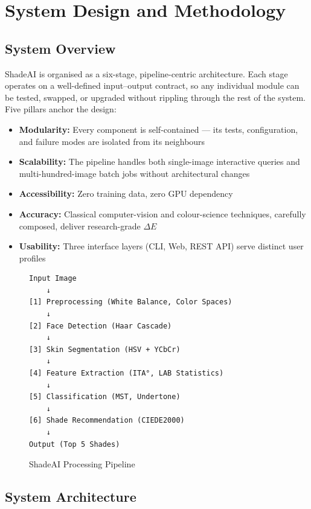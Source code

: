 \chapter{System Design and Methodology}

\section{System Overview}

ShadeAI is organised as a six-stage, pipeline-centric architecture. Each stage operates on a well-defined input–output contract, so any individual module can be tested, swapped, or upgraded without rippling through the rest of the system. Five pillars anchor the design:

\begin{itemize}
    \item \textbf{Modularity:} Every component is self-contained — its tests, configuration, and failure modes are isolated from its neighbours
    \item \textbf{Scalability:} The pipeline handles both single-image interactive queries and multi-hundred-image batch jobs without architectural changes
    \item \textbf{Accessibility:} Zero training data, zero GPU dependency
    \item \textbf{Accuracy:} Classical computer-vision and colour-science techniques, carefully composed, deliver research-grade $\Delta E$
    \item \textbf{Usability:} Three interface layers (CLI, Web, REST API) serve distinct user profiles
\end{itemize}

\begin{figure}[h]
\centering
\begin{verbatim}
Input Image
    ↓
[1] Preprocessing (White Balance, Color Spaces)
    ↓
[2] Face Detection (Haar Cascade)
    ↓
[3] Skin Segmentation (HSV + YCbCr)
    ↓
[4] Feature Extraction (ITA°, LAB Statistics)
    ↓
[5] Classification (MST, Undertone)
    ↓
[6] Shade Recommendation (CIEDE2000)
    ↓
Output (Top 5 Shades)
\end{verbatim}
\caption{ShadeAI Processing Pipeline}
\end{figure}

\section{System Architecture}

